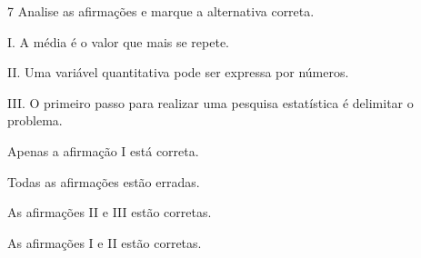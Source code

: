 




\num{7} Analise as afirmações e marque a alternativa correta.

I. A média é o valor que mais se repete.

II. Uma variável quantitativa pode ser expressa por números.

III. O primeiro passo para realizar uma pesquisa estatística é
delimitar o problema.


\begin{escolha}
\item Apenas a afirmação I está correta.
\item Todas as afirmações estão erradas.
\item As afirmações II e III estão corretas.
\item As afirmações I e II estão corretas.
\end{escolha}






